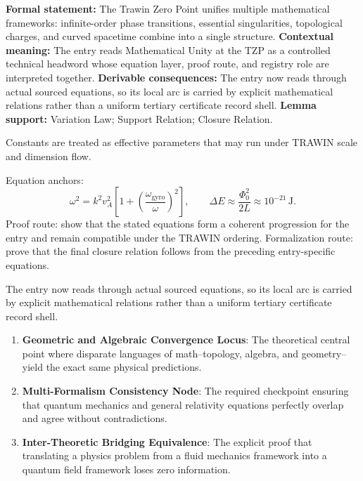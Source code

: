 \begingroup\footnotesize\setlength{\emergencystretch}{3em}\sloppy
\textbf{Formal statement:} The Trawin Zero Point unifies multiple mathematical frameworks: infinite-order phase transitions, essential singularities, topological charges, and curved spacetime combine into a single structure. \textbf{Contextual meaning:} The entry reads Mathematical Unity at the TZP as a controlled technical headword whose equation layer, proof route, and registry role are interpreted together. \textbf{Derivable consequences:} The entry now reads through actual sourced equations, so its local arc is carried by explicit mathematical relations rather than a uniform tertiary certificate record shell. \textbf{Lemma support:} Variation Law; Support Relation; Closure Relation.\par
\endgroup

Constants are treated as effective parameters that may run under TRAWIN scale and dimension flow.

Equation anchors:
\[
\omega^2=k^2v_A^2\left[1+\left(\frac{\omega_{\mathrm{gyro}}}{\omega}\right)^2\right],
\qquad
\Delta E\approx\frac{\Phi_0^2}{2L}\approx10^{-21}\,\mathrm{J}.
\]
Proof route: show that the stated equations form a coherent progression for the entry and remain compatible under the TRAWIN ordering. Formalization route: prove that the final closure relation follows from the preceding entry-specific equations.

The entry now reads through actual sourced equations, so its local arc is carried by explicit mathematical relations rather than a uniform tertiary certificate record shell.
\endgroup

\begin{enumerate}[leftmargin=1.6em,itemsep=6pt,topsep=4pt]
\item \textbf{Geometric and Algebraic Convergence Locus}: The theoretical central point where disparate languages of math--topology, algebra, and geometry--yield the exact same physical predictions.
\item \textbf{Multi-Formalism Consistency Node}: The required checkpoint ensuring that quantum mechanics and general relativity equations perfectly overlap and agree without contradictions.
\item \textbf{Inter-Theoretic Bridging Equivalence}: The explicit proof that translating a physics problem from a fluid mechanics framework into a quantum field framework loses zero information.
\end{enumerate}

